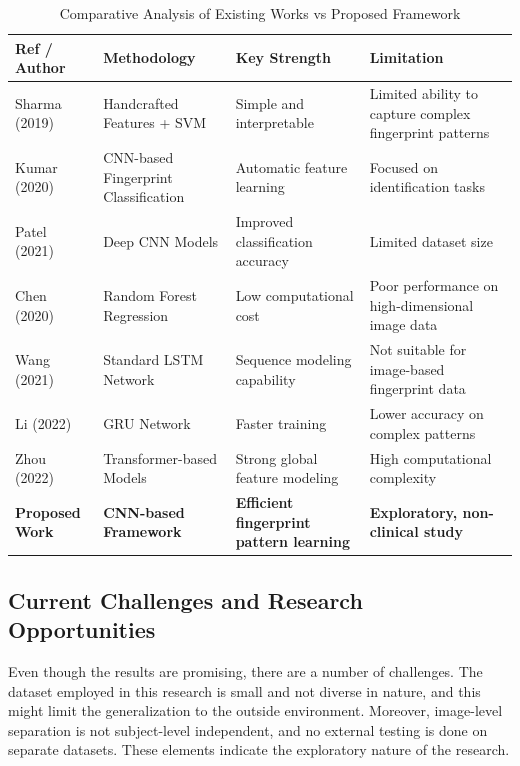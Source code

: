 \documentclass[conference]{IEEEtran}
\begin{document}
\begin{table}[!t]
\centering
\caption{Comparative Analysis of Existing Works vs Proposed Framework}
\label{tab:comparison}
\renewcommand{\arraystretch}{1.3} 
\begin{tabularx}{\textwidth}{@{} p{3.5cm} >{\raggedright\arraybackslash}X >{\raggedright\arraybackslash}X >{\raggedright\arraybackslash}X @{}}
\toprule
\textbf{Ref / Author} & \textbf{Methodology} & \textbf{Key Strength} & \textbf{Limitation} \\
\midrule
Sharma (2019) \cite{b1} & Handcrafted Features + SVM & Simple and interpretable & Limited ability to capture complex fingerprint patterns \\
Kumar (2020) \cite{b2} & CNN-based Fingerprint Classification & Automatic feature learning & Focused on identification tasks \\
Patel (2021) \cite{b3} & Deep CNN Models & Improved classification accuracy & Limited dataset size \\
Chen (2020) \cite{b4} & Random Forest Regression & Low computational cost & Poor performance on high-dimensional image data \\
Wang (2021) \cite{b9} & Standard LSTM Network & Sequence modeling capability & Not suitable for image-based fingerprint data \\
Li (2022) \cite{b10} & GRU Network & Faster training & Lower accuracy on complex patterns \\
Zhou (2022) \cite{b14} & Transformer-based Models & Strong global feature modeling & High computational complexity \\
\textbf{Proposed Work} & \textbf{CNN-based Framework} & \textbf{Efficient fingerprint pattern learning} & \textbf{Exploratory, non-clinical study} \\
\bottomrule
\end{tabularx}
\end{table}

\subsection{Current Challenges and Research Opportunities}
Even though the results are promising, there are a number of challenges. The dataset employed in this research is small and not diverse in nature, and this might limit the generalization to the outside environment. Moreover, image-level separation is not subject-level independent, and no external testing is done on separate datasets. These elements indicate the exploratory nature of the research.  
\end{document}
